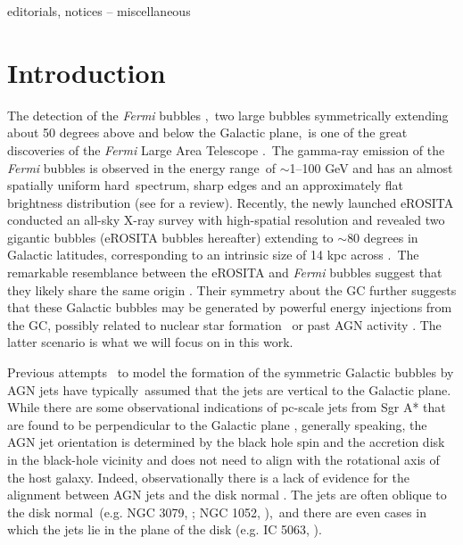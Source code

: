 \documentclass[fleqn,usenatbib,useAMS]{mnras}
\begin{document}
\begin{keywords}
editorials, notices -- miscellaneous
\end{keywords}



\begingroup
\let\clearpage\relax
\endgroup
\newpage



\section{Introduction}
The detection of the \textit{Fermi} bubbles \citep{Su2012,Ackermann2014,Narayanan2017},\
two large bubbles symmetrically extending about 50 degrees above and below the Galactic plane,\
is one of the great discoveries of the \textit{Fermi} Large Area Telescope \citep{Atwood2009}.\
The gamma-ray emission of the \textit{Fermi} bubbles is observed in the energy range\
of $\sim$1--100 GeV and has an almost spatially uniform hard\
spectrum, sharp edges and an approximately flat brightness distribution (see \cite{Yang2018} for a review). Recently, the newly launched eROSITA \citep{Predehl2021} conducted an all-sky X-ray survey with high-spatial resolution and revealed two gigantic bubbles (eROSITA bubbles hereafter) extending to $\sim 80$ degrees in Galactic latitudes, corresponding to an intrinsic size of 14 kpc across \citep{Predehl2020}.\
The remarkable resemblance between the eROSITA and \textit{Fermi} bubbles suggest that they likely share the same origin \citep{Yang2022}.
Their symmetry about the GC further suggests that these Galactic bubbles may be generated by powerful energy injections from the GC, possibly related to nuclear star formation\
\citep{PhysRevLett.106.101102,Carretti2013,Crocker2015,Sarkar2015}
or past AGN activity \citep{Guo2012,Guo2012b,Yang2012,Yang2013,Mou2014,Yang2017}. The latter scenario is what we will focus on in this work.

Previous attempts \citep{Guo2012,Yang2012,Zhang2020}\
to model the formation of the symmetric Galactic bubbles by AGN jets have typically\
assumed that the jets are vertical to the Galactic plane. While there are some observational indications of pc-scale jets from Sgr A* that are found to be perpendicular to the Galactic plane \citep{Li, Zhu}, generally speaking, the AGN jet orientation is determined by the black hole spin and the accretion disk in the black-hole vicinity and does not need to align with the rotational axis of the host galaxy. Indeed, observationally there is a lack of evidence for the alignment between AGN jets and the disk normal \citep[e.g.,][]{Gallimore2006}. The jets are often oblique to the disk normal\
(e.g. NGC 3079, \citealt{Cecil2001}; NGC 1052, \citealt{Dopita2015}),\
and there are even cases in which the jets lie in the plane of the disk (e.g. IC 5063, \citealt{Morganti2015}).\
\end{document}
